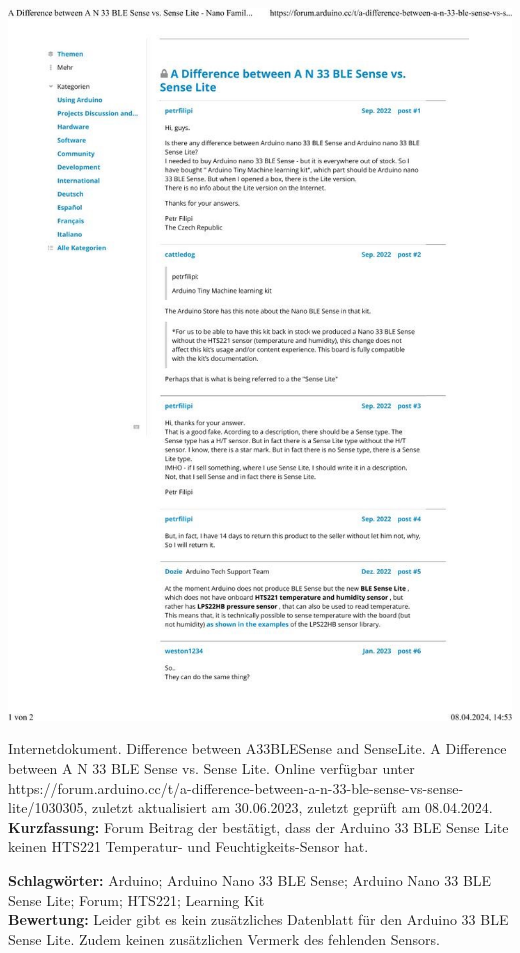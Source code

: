 {
\begin{minipage}{0.38\textwidth}
	\includegraphics[width=\linewidth]{images/Filipi.jpg}
\end{minipage}
\hfill
\begin{minipage}{0.6\textwidth}
Internetdokument. Difference between A33BLESense and SenseLite. A Difference between A N 33 BLE Sense vs. Sense Lite. Online verfügbar unter https://forum.arduino.cc/t/a-difference-between-a-n-33-ble-sense-vs-sense-lite/1030305, zuletzt aktualisiert am 30.06.2023, zuletzt geprüft am 08.04.2024.
\\ \textbf{Kurzfassung:}
Forum Beitrag der bestätigt, dass der Arduino 33 BLE Sense Lite keinen HTS221 Temperatur- und Feuchtigkeits-Sensor hat.
\end{minipage}
\textbf{Schlagwörter:}
Arduino; Arduino Nano 33 BLE Sense; Arduino Nano 33 BLE Sense Lite; Forum; HTS221; Learning Kit
\\ \textbf{Bewertung:}
Leider gibt es kein zusätzliches Datenblatt für den Arduino 33 BLE Sense Lite. Zudem keinen zusätzlichen Vermerk des fehlenden Sensors.
}

